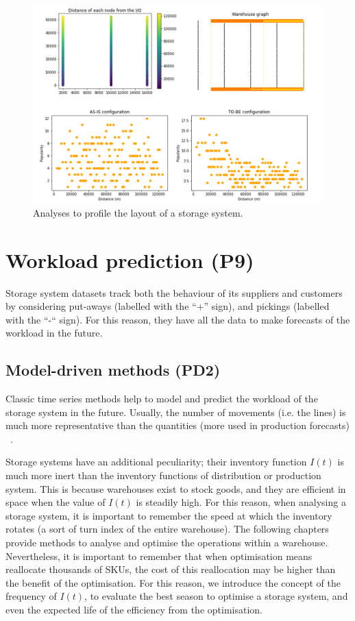 \begin{figure}[hbt!]
\centering
\includegraphics[width=1.0\textwidth]{SectionWarehouses/control_figures/fig_layout_profile.png}
\captionsetup{type=figure}
\caption{Analyses to profile the layout of a storage system.}
\label{fig_layout_profile}
\end{figure}

\clearpage

\section{Workload prediction (P9)}
Storage system datasets track both the behaviour of its suppliers and customers by considering put-aways (labelled with the “+” sign), and pickings (labelled with the “-“ sign). For this reason, they have all the data to make forecasts of the workload in the future.

\subsection{Model-driven methods (PD2)}
Classic time series methods help to model and predict the workload of the storage system in the future. Usually, the number of movements (i.e. the lines) is much more representative than the quantities (more used in production forecasts) ~\cite{VanGils2017a}.\par

Storage systems have an additional peculiarity; their inventory function $I(t)$ is much more inert than the inventory functions of distribution or production system. This is because warehouses exist to stock goods, and they are efficient in space when the value of $I(t)$ is steadily high. For this reason, when analysing a storage system, it is important to remember the speed at which the inventory rotates (a sort of turn index of the entire warehouse). The following chapters provide methods to analyse and optimise the operations within a warehouse. Nevertheless, it is important to remember that when optimisation means reallocate thousands of SKUs, the cost of this reallocation may be higher than the benefit of the optimisation. For this reason, we introduce the concept of the frequency of $I(t)$, to evaluate the best season to optimise a storage system, and even the expected life of the efficiency from the optimisation.

